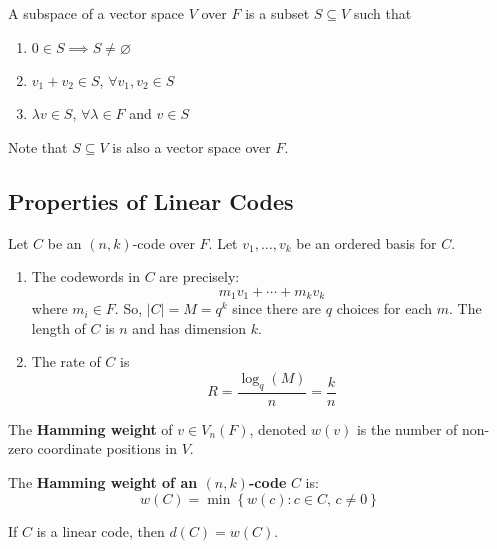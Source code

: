 \begin{defbox}
    \begin{definition}
    A subspace of a vector space $ V $ over $ F $ is a subset
    $ S\subseteq V $ such that
    \begin{enumerate}[V1]
        \item $ 0\in S \implies S\neq \varnothing $
        \item $ v_1+v_2\in S $, $ \forall v_1,v_2\in S $
        \item $ \lambda v\in S $, $ \forall \lambda\in F $ and $ v\in S $
    \end{enumerate}
    Note that $ S\subseteq V $ is also a vector space over $ F $. 
\end{definition} \end{defbox}

\subsection{Properties of Linear Codes}
Let $ C $ be an $ (n,k) $-code over $ F $. Let $ v_1,\ldots,v_k $ be
an ordered basis for $ C $.
\begin{enumerate}[(1)]
    \item The codewords in $ C $ are precisely:
    \[ m_1v_1+\cdots +m_kv_k \]
    where $ m_i\in F $. So, $ |C|=M=q^k $ since there are $ q $ choices for each $ m $.
    The length of $ C $ is $ n $ and has dimension $ k $.
    \item The rate of $ C $ is
    \[ R=\frac{\log_q(M)}{n} =\frac{k}{n} \]
\end{enumerate}

\begin{defbox}
    \begin{definition}
    The \textbf{Hamming weight} of $ v\in V_n(F) $, denoted
    $ w(v) $ is the number of non-zero coordinate positions in $ V $.
\end{definition} \end{defbox}

\begin{defbox}
    \begin{definition}
    The \textbf{Hamming weight of an $ (n,k) $-code} $ C $ is:
    \[ w(C)=\min \left\{ w(c):c\in C,\,c\neq 0\right\} \]
\end{definition} \end{defbox}

\begin{thmbox}
    \begin{theorem}
    If $ C $ is a linear code, then $ d(C)=w(C) $.
\end{theorem} \end{thmbox}

